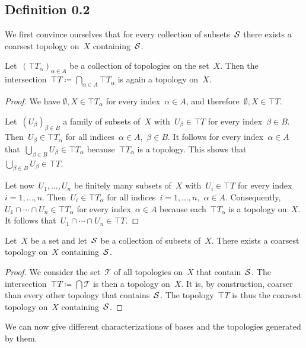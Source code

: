 \subsection{Definition 0.2}

We first convince ourselves that for every collection of subsets~$\mathcal{S}$ there exists a coarsest topology on~$X$ containing~$\mathcal{S}$.

\begin{proposition}
	\label{intersection of topologies}
	Let~$(\top{T}_α)_{α ∈ A}$ be a collection of topologies on the set~$X$.
	Then the intersection~$\top{T} ≔ ⋂_{α ∈ A} \top{T}_α$ is again a topology on~$X$.
\end{proposition}

\begin{proof}
	We have $∅, X ∈ \top{T}_α$ for every index~$α ∈ A$, and therefore~$∅, X ∈ \top{T}$.

	Let~$(U_β)_{β ∈ B}$ a family of subsets of~$X$ with~$U_β ∈ \top{T}$ for every index~$β ∈ B$.
	Then~$U_β ∈ \top{T}_α$ for all indices~$α ∈ A$,~$β ∈ B$.
	It follows for every index~$α ∈ A$ that~$⋃_{β ∈ B} U_β ∈ \top{T}_α$ because~$\top{T}_α$ is a topology.
	This shows that~$⋃_{β ∈ B} U_β ∈ \top{T}$.

	Let now~$U_1, \dotsc, U_n$ be finitely many subsets of~$X$ with~$U_i ∈ \top{T}$ for every index~$i = 1, \dotsc, n$.
	Then~$U_i ∈ \top{T}_α$ for all indices~$i = 1, \dotsc, n$,~$α ∈ A$.
	Consequently,~$U_1 ∩ \dotsb ∩ U_n ∈ \top{T}_α$ for every index~$α ∈ A$ because each~$\top{T}_α$ is a topology on~$X$.
	It follows that~$U_1 ∩ \dotsb ∩ U_n ∈ \top{T}$.
\end{proof}

\begin{proposition}
	Let~$X$ be a set and let~$\mathcal{S}$ be a collection of subsets of~$X$.
	There exists a coarsest topology on~$X$ containing~$\mathcal{S}$.
\end{proposition}

\begin{proof}
	We consider the set~$\mathscr{T}$ of all topologies on~$X$ that contain~$\mathcal{S}$.
	The intersection~$\top{T} ≔ ⋂ \mathscr{T}$ is then a topology on~$X$.
	It is, by construction, coarser than every other topology that contains~$\mathcal{S}$.
	The topology~$\top{T}$ is thus the coarsest topology on~$X$ containing~$\mathcal{S}$.
\end{proof}

We can now give different characterizations of bases and the topologies generated by them.

